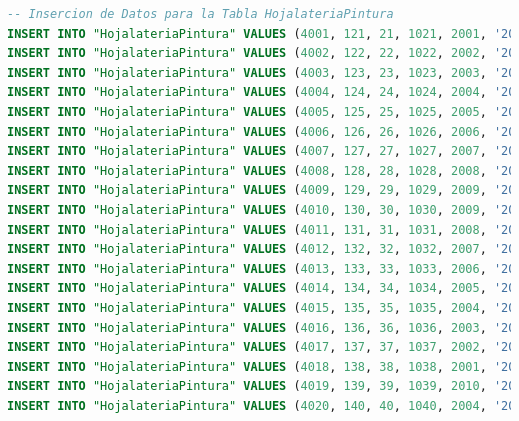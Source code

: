 \documentclass[12pt]{article}
\begin{document}
\begin{lstlisting}[language=SQL]
-- Insercion de Datos para la Tabla HojalateriaPintura
INSERT INTO "HojalateriaPintura" VALUES (4001, 121, 21, 1021, 2001, '2023-01-15');
INSERT INTO "HojalateriaPintura" VALUES (4002, 122, 22, 1022, 2002, '2023-02-20');
INSERT INTO "HojalateriaPintura" VALUES (4003, 123, 23, 1023, 2003, '2023-03-25');
INSERT INTO "HojalateriaPintura" VALUES (4004, 124, 24, 1024, 2004, '2023-04-30');
INSERT INTO "HojalateriaPintura" VALUES (4005, 125, 25, 1025, 2005, '2023-05-05');
INSERT INTO "HojalateriaPintura" VALUES (4006, 126, 26, 1026, 2006, '2023-06-10');
INSERT INTO "HojalateriaPintura" VALUES (4007, 127, 27, 1027, 2007, '2023-07-15');
INSERT INTO "HojalateriaPintura" VALUES (4008, 128, 28, 1028, 2008, '2023-08-20');
INSERT INTO "HojalateriaPintura" VALUES (4009, 129, 29, 1029, 2009, '2023-09-25');
INSERT INTO "HojalateriaPintura" VALUES (4010, 130, 30, 1030, 2009, '2023-10-30');
INSERT INTO "HojalateriaPintura" VALUES (4011, 131, 31, 1031, 2008, '2023-11-05');
INSERT INTO "HojalateriaPintura" VALUES (4012, 132, 32, 1032, 2007, '2023-12-10');
INSERT INTO "HojalateriaPintura" VALUES (4013, 133, 33, 1033, 2006, '2024-01-15');
INSERT INTO "HojalateriaPintura" VALUES (4014, 134, 34, 1034, 2005, '2024-02-20');
INSERT INTO "HojalateriaPintura" VALUES (4015, 135, 35, 1035, 2004, '2024-03-25');
INSERT INTO "HojalateriaPintura" VALUES (4016, 136, 36, 1036, 2003, '2024-04-30');
INSERT INTO "HojalateriaPintura" VALUES (4017, 137, 37, 1037, 2002, '2024-05-05');
INSERT INTO "HojalateriaPintura" VALUES (4018, 138, 38, 1038, 2001, '2024-06-10');
INSERT INTO "HojalateriaPintura" VALUES (4019, 139, 39, 1039, 2010, '2024-07-15');
INSERT INTO "HojalateriaPintura" VALUES (4020, 140, 40, 1040, 2004, '2024-08-20');


\end{lstlisting}
\end{document}
